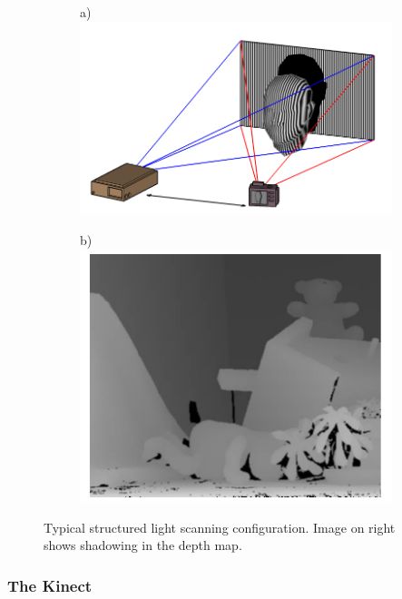 \begin{figure}[ht]
\centering
        \begin{subfigure}(a)
            \label{lightscanner}
            \centering
            \includegraphics[scale=0.3]{images/structuredlightscanner.PNG}
            \end{subfigure}
            \begin{subfigure}(b)
                \label{shadowing}
                \centering
                \includegraphics[scale=0.3]{images/occludedareas.PNG}
        \end{subfigure}
	    \caption{Typical structured light scanning configuration. Image on right shows shadowing in the depth map.}
\end{figure}

\subsubsection{The Kinect}

